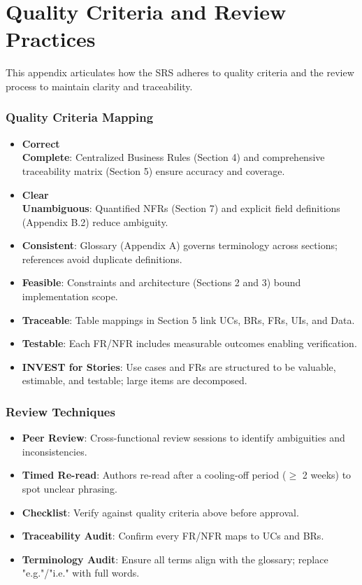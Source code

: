 \documentclass[12pt,a4paper]{article}
\begin{document}
\section{Quality Criteria and Review Practices}
This appendix articulates how the SRS adheres to quality criteria and the review process to maintain clarity and traceability.

\subsubsection{Quality Criteria Mapping}
\begin{itemize}
    \item \textbf{Correct \\ Complete}: Centralized Business Rules (Section 4) and comprehensive traceability matrix (Section 5) ensure accuracy and coverage.
    \item \textbf{Clear \\ Unambiguous}: Quantified NFRs (Section 7) and explicit field definitions (Appendix B.2) reduce ambiguity.
    \item \textbf{Consistent}: Glossary (Appendix A) governs terminology across sections; references avoid duplicate definitions.
    \item \textbf{Feasible}: Constraints and architecture (Sections 2 and 3) bound implementation scope.
    \item \textbf{Traceable}: Table mappings in Section 5 link UCs, BRs, FRs, UIs, and Data.
    \item \textbf{Testable}: Each FR/NFR includes measurable outcomes enabling verification.
    \item \textbf{INVEST for Stories}: Use cases and FRs are structured to be valuable, estimable, and testable; large items are decomposed.
\end{itemize}

\subsubsection{Review Techniques}
\begin{itemize}
    \item \textbf{Peer Review}: Cross-functional review sessions to identify ambiguities and inconsistencies.
    \item \textbf{Timed Re-read}: Authors re-read after a cooling-off period (\(\geq\) 2 weeks) to spot unclear phrasing.
    \item \textbf{Checklist}: Verify against quality criteria above before approval.
    \item \textbf{Traceability Audit}: Confirm every FR/NFR maps to UCs and BRs.
    \item \textbf{Terminology Audit}: Ensure all terms align with the glossary; replace "e.g."/"i.e." with full words.
\end{itemize}
\end{document}
